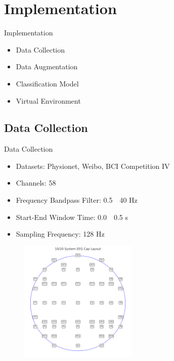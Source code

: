 \section{Implementation}
\begin{frame}{Implementation}
    \begin{itemize}
        \item Data Collection
        \item Data Augmentation
        \item Classification Model
        \item Virtual Environment
    \end{itemize}
\end{frame}

\subsection*{Data Collection}
\begin{frame}{Data Collection}
    \begin{minipage}[c]{.6\textwidth}
        \begin{itemize}
            \item Datasets: Physionet, Weibo, BCI Competition IV
            \item Channels: 58
            \item Frequency Bandpass Filter: 0.5~\textemdash{}~40 Hz
            \item Start-End Window Time: 0.0~\textemdash{}~0.5 s
            \item Sampling Frequency: 128 Hz
        \end{itemize}
    \end{minipage}
    \begin{minipage}[c]{.39\textwidth}
        \begin{figure}[!htbp]
            \centering
            \includegraphics[width=0.5\textwidth]{figures/Methodology/thesis_eeg_cap}
        \end{figure}
    \end{minipage}
\end{frame}

